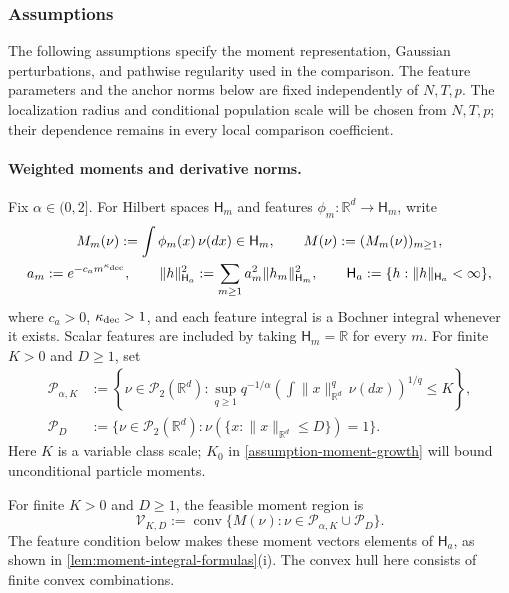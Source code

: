 \subsubsection{Assumptions}

The following assumptions specify the moment representation, Gaussian
perturbations, and pathwise regularity used in the comparison. The feature
parameters and the anchor norms below are fixed independently of $N,T,p$.
The localization radius and conditional population scale will be chosen
from $N,T,p$; their dependence remains in every local comparison coefficient.

\paragraph{Weighted moments and derivative norms.}
Fix $\alpha\in(0,2]$. For Hilbert spaces $\mathsf H_m$ and features
$\phi_m:\mathbb R^d\to\mathsf H_m$, write
\begin{equation}
\label{eq:weighted-moment-space}
\begin{gathered}
 M_m(\nu):=\int\phi_m(x)\,\nu(dx)\in\mathsf H_m,\qquad M(\nu):=(M_m(\nu))_{m\ge1},\\
 a_m:=e^{-c_am^{\kappa_{\rm dec}}},\qquad
 \|h\|_{\mathsf H_a}^2:=\sum_{m\ge1}a_m^2\|h_m\|_{\mathsf H_m}^2,\qquad
 \mathsf H_a:=\{h:\|h\|_{\mathsf H_a}<\infty\},
\end{gathered}
\end{equation}
where $c_a>0$, $\kappa_{\rm dec}>1$, and each feature integral is a
Bochner integral whenever it exists. Scalar features are included by
taking $\mathsf H_m=\mathbb R$ for every $m$. For finite $K>0$ and $D\ge1$, set
\begin{equation}
\label{eq:moment-classes}
\begin{aligned}
 \mathcal P_{\alpha,K}
 &:=\left\{\nu\in\mathcal P_2(\mathbb R^d):
   \sup_{q\ge1}q^{-1/\alpha}
       \left(\int\|x\|_{\mathbb R^d}^q\,\nu(dx)\right)^{1/q}\le K\right\},\\
 \mathcal P_D&:=\{\nu\in\mathcal P_2(\mathbb R^d):
                     \nu(\{x:\|x\|_{\mathbb R^d}\le D\})=1\}.
\end{aligned}
\end{equation}
Here $K$ is a variable class scale; $K_0$ in
\cref{assumption-moment-growth} will bound unconditional particle moments.

\begin{definition}
\label{def:localized-moment-region}
For finite $K>0$ and $D\ge1$, the feasible moment region is
\begin{equation}
\label{eq:localized-feasible-moment-region}
 \mathcal V_{K,D}:=\operatorname{conv}
     \{M(\nu):\nu\in\mathcal P_{\alpha,K}\cup\mathcal P_D\}.
\end{equation}
The feature condition below makes these moment vectors elements of
$\mathsf H_a$, as shown in \cref{lem:moment-integral-formulas}(i).
The convex hull here consists of finite convex combinations.
\end{definition}

